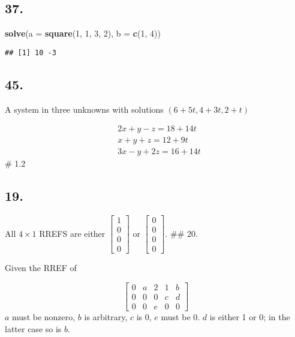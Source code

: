 \documentclass[]{article}
\newenvironment{Shaded}{\begin{snugshade}}{\end{snugshade}}
\newcommand{\DataTypeTok}[1]{\textcolor[rgb]{0.13,0.29,0.53}{#1}}
\newcommand{\DecValTok}[1]{\textcolor[rgb]{0.00,0.00,0.81}{#1}}
\newcommand{\KeywordTok}[1]{\textcolor[rgb]{0.13,0.29,0.53}{\textbf{#1}}}
\newcommand{\NormalTok}[1]{#1}
\begin{document}
\hypertarget{section-5}{%
\subsection{37.}\label{section-5}}

\begin{Shaded}
\begin{Highlighting}[]
\KeywordTok{solve}\NormalTok{(}\DataTypeTok{a =} \KeywordTok{square}\NormalTok{(}\DecValTok{1}\NormalTok{, }\DecValTok{1}\NormalTok{, }\DecValTok{3}\NormalTok{, }\DecValTok{2}\NormalTok{), }\DataTypeTok{b =} \KeywordTok{c}\NormalTok{(}\DecValTok{1}\NormalTok{, }\DecValTok{4}\NormalTok{))}
\end{Highlighting}
\end{Shaded}

\begin{verbatim}
## [1] 10 -3
\end{verbatim}

\hypertarget{section-6}{%
\subsection{45.}\label{section-6}}

A system in three unknowns with solutions \((6+5t, 4 + 3t, 2 +t)\)

\[
  \begin{aligned}
    & 2x + y -z = 18 + 14 t\\
    & x +y + z = 12 + 9t\\
    & 3x -y + 2z = 16+ 14t
  \end{aligned}
\] \# 1.2

\hypertarget{section-7}{%
\subsection{19.}\label{section-7}}

All \(4 \times 1\) RREFS are either
\(\begin{bmatrix}1\\0\\0\\0\end{bmatrix}\) or
\(\begin{bmatrix}0\\0\\0\\0\end{bmatrix}\). \#\# 20.

Given the RREF of

\[
  \begin{bmatrix}
  0 & a & 2 &1 & b\\
  0 & 0 &0 & c &d\\
  0 & 0 & e & 0 &0
  \end{bmatrix}
\] \(a\) must be nonzero, \(b\) is arbitrary, \(c\) is 0, \(e\) must be
0. \(d\) is either 1 or 0; in the latter case so is \(b\).
\end{document}
